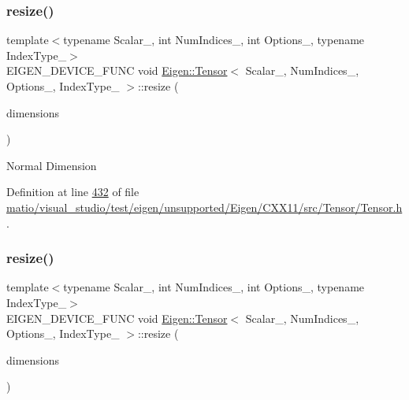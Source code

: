 \subsubsection{\texorpdfstring{resize()}{resize()}\hspace{0.1cm}{\footnotesize\ttfamily [1/4]}}
{\footnotesize\ttfamily template$<$typename Scalar\+\_\+, int Num\+Indices\+\_\+, int Options\+\_\+, typename Index\+Type\+\_\+$>$ \\
E\+I\+G\+E\+N\+\_\+\+D\+E\+V\+I\+C\+E\+\_\+\+F\+U\+NC void \hyperlink{class_eigen_1_1_tensor}{Eigen\+::\+Tensor}$<$ Scalar\+\_\+, Num\+Indices\+\_\+, Options\+\_\+, Index\+Type\+\_\+ $>$\+::resize (\begin{DoxyParamCaption}\item[{const \hyperlink{class_eigen_1_1array}{array}$<$ Index, Num\+Indices $>$ \&}]{dimensions }\end{DoxyParamCaption})\hspace{0.3cm}{\ttfamily [inline]}}

Normal Dimension 

Definition at line \hyperlink{matio_2visual__studio_2test_2eigen_2unsupported_2_eigen_2_c_x_x11_2src_2_tensor_2_tensor_8h_source_l00432}{432} of file \hyperlink{matio_2visual__studio_2test_2eigen_2unsupported_2_eigen_2_c_x_x11_2src_2_tensor_2_tensor_8h_source}{matio/visual\+\_\+studio/test/eigen/unsupported/\+Eigen/\+C\+X\+X11/src/\+Tensor/\+Tensor.\+h}.

\mbox{\label{class_eigen_1_1_tensor_a5ab1ec6dc9b05d5e4db3600bc9d2cc6b}} 
\subsubsection{\texorpdfstring{resize()}{resize()}\hspace{0.1cm}{\footnotesize\ttfamily [2/4]}}
{\footnotesize\ttfamily template$<$typename Scalar\+\_\+, int Num\+Indices\+\_\+, int Options\+\_\+, typename Index\+Type\+\_\+$>$ \\
E\+I\+G\+E\+N\+\_\+\+D\+E\+V\+I\+C\+E\+\_\+\+F\+U\+NC void \hyperlink{class_eigen_1_1_tensor}{Eigen\+::\+Tensor}$<$ Scalar\+\_\+, Num\+Indices\+\_\+, Options\+\_\+, Index\+Type\+\_\+ $>$\+::resize (\begin{DoxyParamCaption}\item[{const \hyperlink{class_eigen_1_1array}{array}$<$ Index, Num\+Indices $>$ \&}]{dimensions }\end{DoxyParamCaption})\hspace{0.3cm}{\ttfamily [inline]}}

